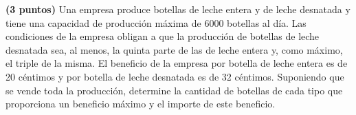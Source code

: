 
\textbf{(3 puntos)} Una empresa produce botellas de leche entera y de leche desnatada y tiene una capacidad de producción máxima de 6000 botellas al día. Las condiciones de la empresa obligan a que la producción de botellas de leche desnatada sea, al menos, la quinta parte de las de leche entera y, como máximo, el triple de la misma. El beneficio de la empresa por botella de leche entera es de 20 céntimos y por botella de leche desnatada es de 32 céntimos. Suponiendo que se vende toda la producción, determine la cantidad de botellas de cada tipo que proporciona un beneficio máximo y el importe de este beneficio.
